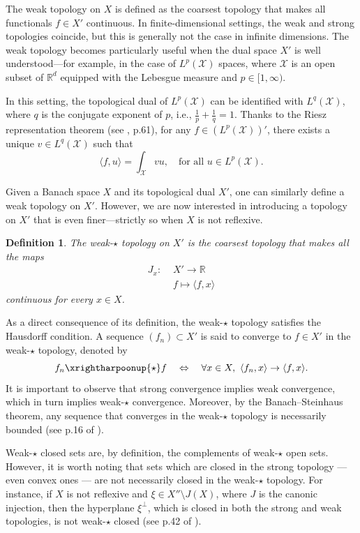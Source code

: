 \documentclass[a4paper, 11pt]{article}
\newtheorem{df}{Definition}
\theoremstyle{definition}
\newcommand{\R}{{\mathbb{R}}}
\newcommand{\cX}{{\mathcal{X}}}
\begin{document}
{The weak topology on \({X}\) is defined as the coarsest topology that makes all functionals \(f \in {X}'\) continuous. In finite-dimensional settings, the weak and strong topologies coincide, but this is generally not the case in infinite dimensions. The weak topology becomes particularly useful when the dual space \({X}'\) is well understood—for example, in the case of \(L^p(\cX)\) spaces, where \(\cX\) is an open subset of \(\mathbb{R}^d\) equipped with the Lebesgue measure and \(p \in [1, \infty)\).

In this setting, the topological dual of \(L^p(\cX)\) can be identified with \(L^q(\cX)\), where \(q\) is the conjugate exponent of \(p\), i.e., \(\frac{1}{p} + \frac{1}{q} = 1\). Thanks to the Riesz representation theorem (see \cite{Bre83}, p.61), for any \(f \in (L^p(\cX))'\), there exists a unique \(v \in L^q(\cX)\) such that
\[
\langle f, u \rangle = \int_\cX v u, \quad \text{for all } u \in L^p(\cX).
\]

Given a Banach space \({X}\) and its topological dual \({X}'\), one can similarly define a weak topology on \({X}'\). However, we are now interested in introducing a topology on \({X}'\) that is even finer—strictly so when \({X}\) is not reflexive.


\begin{df}{\label{def: weakstar top}}
The weak-\(\star\) topology on \({X}'\) is the coarsest topology that makes all the maps  
\begin{align*}
J_x : \, \, & {X}' \rightarrow \R \\
& f \mapsto \langle f, x \rangle
\end{align*} 
continuous for every \(x \in {X}\).  
\end{df}

As a direct consequence of its definition, the weak-$\star$ topology satisfies the Hausdorff condition. A sequence \((f_n) \subset {X}'\) is said to converge to \(f \in {X}'\) in the weak-$\star$ topology, denoted by
\[
f_n \xrightharpoonup{\star} f \quad \Leftrightarrow \quad \forall x \in {X}, \ \langle f_n, x \rangle \to \langle f, x \rangle.
\]
It is important to observe that strong convergence implies weak convergence, which in turn implies weak-$\star$ convergence. Moreover, by the Banach–Steinhaus theorem, any sequence that converges in the weak-$\star$ topology is necessarily bounded (see p.16 of \cite{Bre83}).

Weak-$\star$ closed sets are, by definition, the complements of weak-$\star$ open sets. However, it is worth noting that sets which are closed in the strong topology — even convex ones — are not necessarily closed in the weak-$\star$ topology. For instance, if \({X}\) is not reflexive and \(\xi \in {X}'' \setminus J({X})\), where $J$ is the canonic injection, then the hyperplane \(\xi^\perp\), which is closed in both the strong and weak topologies, is not weak-$\star$ closed (see p.42 of \cite{Bre83}).

}
\end{document}
